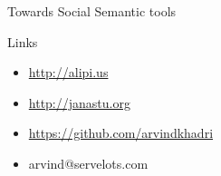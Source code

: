 \documentclass[''urlcolor=red'']{beamer}
\begin{document}
\begin{frame}{Towards Social Semantic tools}
  \begin{block}{Links}
    \begin{itemize}
    \item \url{http://alipi.us}
    \item \url{http://janastu.org}
    \item \url{https://github.com/arvindkhadri}
    \item arvind@servelots.com
    \end{itemize}
  \end{block}
\end{frame}
\end{document}
